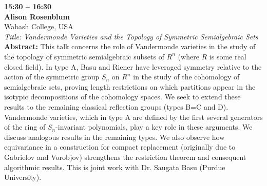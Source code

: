 \documentclass[10pt,a4paper]{article}
\begin{document}
\begin{tcolorbox}[talkbox]
\textbf{15:30 -- 16:30} \\
\textbf{Alison Rosenblum} \\
Wabash College, USA \\
\textit{Title: Vandermonde Varieties and the Topology of Symmetric Semialgebraic Sets} \\
\textbf{Abstract:} This talk concerns the role of Vandermonde varieties in the study of the topology of symmetric semialgebraic subsets of $R^n$ (where $R$ is some real closed field). In type A, Basu and Riener have leveraged symmetry relative to the action of the symmetric group $S_n$ on $R^n$ in the study of the cohomology of semialgebraic sets, proving length restrictions on which partitions appear in the isotypic decompositions of the cohomology spaces. We seek to extend these results to the remaining classical reflection groups (types B=C and D). Vandermonde varieties, which in type A are defined by the first several generators of the ring of $S_n$-invariant polynomials, play a key role in these arguments. We discuss analogous results in the remaining types. We also observe how equivariance in a construction for compact replacement (originally due to Gabrielov and Vorobjov) strengthens the restriction theorem and consequent algorithmic results. This is joint work with Dr. Saugata Basu (Purdue University).
\end{tcolorbox}
\end{document}
